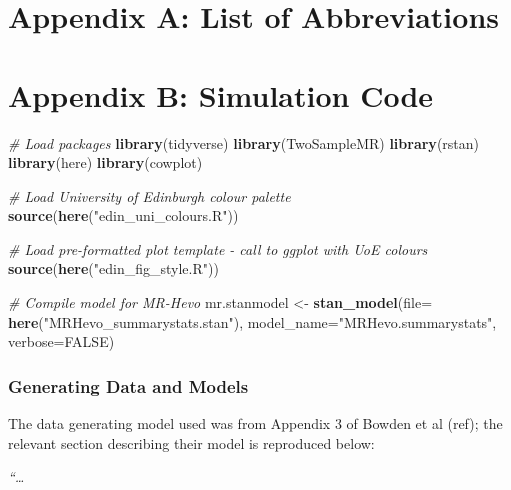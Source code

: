 \documentclass[
]{article}
\newenvironment{Shaded}{\begin{snugshade}}{\end{snugshade}}
\newcommand{\AttributeTok}[1]{\textcolor[rgb]{0.13,0.29,0.53}{#1}}
\newcommand{\CommentTok}[1]{\textcolor[rgb]{0.56,0.35,0.01}{\textit{#1}}}
\newcommand{\ConstantTok}[1]{\textcolor[rgb]{0.56,0.35,0.01}{#1}}
\newcommand{\FunctionTok}[1]{\textcolor[rgb]{0.13,0.29,0.53}{\textbf{#1}}}
\newcommand{\NormalTok}[1]{#1}
\newcommand{\OtherTok}[1]{\textcolor[rgb]{0.56,0.35,0.01}{#1}}
\newcommand{\StringTok}[1]{\textcolor[rgb]{0.31,0.60,0.02}{#1}}
\begin{document}
\appendix


\newpage

\section{Appendix A: List of Abbreviations}\label{appendix-a-list-of-abbreviations}

\newpage

\section{Appendix B: Simulation Code}\label{appendix-b-simulation-code}

\begin{Shaded}
\begin{Highlighting}[]
\CommentTok{\# Load packages}
 \FunctionTok{library}\NormalTok{(tidyverse)}
 \FunctionTok{library}\NormalTok{(TwoSampleMR)}
 \FunctionTok{library}\NormalTok{(rstan)}
 \FunctionTok{library}\NormalTok{(here)}
 \FunctionTok{library}\NormalTok{(cowplot)}

\CommentTok{\# Load University of Edinburgh colour palette}
 \FunctionTok{source}\NormalTok{(}\FunctionTok{here}\NormalTok{(}\StringTok{"edin\_uni\_colours.R"}\NormalTok{))}

\CommentTok{\# Load pre{-}formatted plot template {-} call to ggplot with UoE colours}
 \FunctionTok{source}\NormalTok{(}\FunctionTok{here}\NormalTok{(}\StringTok{"edin\_fig\_style.R"}\NormalTok{))}

\CommentTok{\# Compile model for MR{-}Hevo}
\NormalTok{ mr.stanmodel }\OtherTok{\textless{}{-}} \FunctionTok{stan\_model}\NormalTok{(}\AttributeTok{file=} \FunctionTok{here}\NormalTok{(}\StringTok{"MRHevo\_summarystats.stan"}\NormalTok{),}
                                   \AttributeTok{model\_name=}\StringTok{"MRHevo.summarystats"}\NormalTok{, }\AttributeTok{verbose=}\ConstantTok{FALSE}\NormalTok{)}
\end{Highlighting}
\end{Shaded}

\subsubsection{Generating Data and Models}\label{generating-data-and-models}

The data generating model used was from Appendix 3 of Bowden et al (ref); the relevant section describing their model is reproduced below:

\emph{``\ldots{}}
\end{document}
